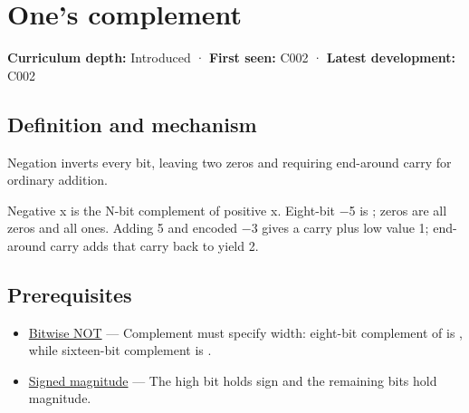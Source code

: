 \hypertarget{appendix-03c678cd40b3}{}\label{referencestart:appendix-03c678cd40b3}
\section{One's complement}\label{appendix-03c678cd40b3-ones-complement}

\hypertarget{appendix-03c678cd40b3-ones-complement}{}

\textbf{Curriculum depth:} Introduced · \textbf{First seen:} C002 · \textbf{Latest development:} C002

\begin{allmightroledefinition}

\subsection{Definition and mechanism}\label{appendix-03c678cd40b3-definition-and-mechanism}

\hypertarget{appendix-03c678cd40b3-definition-and-mechanism}{}

Negation inverts every bit, leaving two zeros and requiring end-around carry for ordinary addition.

\end{allmightroledefinition}

Negative x is the N-bit complement of positive x. Eight-bit −5 is ; zeros are all zeros and all ones. Adding 5 and encoded −3 gives a carry plus low value 1; end-around carry adds that carry back to yield 2.

\subsection{Prerequisites}\label{appendix-03c678cd40b3-prerequisites}

\hypertarget{appendix-03c678cd40b3-prerequisites}{}

\begin{itemize}
\tightlist
\item
  \hyperref[appendix-8f38927cfc54]{Bitwise NOT} --- Complement must specify width: eight-bit complement of  is , while sixteen-bit complement is .
\item
  \hyperref[appendix-ce20506c8532]{Signed magnitude} --- The high bit holds sign and the remaining bits hold magnitude.
\end{itemize}

